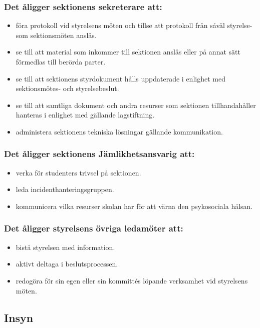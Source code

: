\subsubsection{Det åligger sektionens sekreterare att:}

\begin{itemize}
  \item föra protokoll vid styrelsens möten och tillse att protokoll från såväl styrelse- som sektionsmöten anslås.
  \item se till att material som inkommer till sektionen anslås eller på annat sätt förmedlas till berörda parter.
  \item se till att sektionens styrdokument hålls uppdaterade i enlighet med sektionsmötes- och styrelsebeslut.
  \item se till att samtliga dokument och andra resurser som sektionen tillhandahåller hanteras i enlighet med gällande lagstiftning.
  \item administera sektionens tekniska lösningar gällande kommunikation.
\end{itemize}

\subsubsection{Det åligger sektionens Jämlikhetsansvarig att:}

\begin{itemize}
    \item verka för studenters trivsel på sektionen.
    \item leda incidenthanteringsgruppen.
    \item kommunicera vilka resurser skolan har för att värna den psykosociala
hälsan.
\end{itemize}

\subsubsection{Det åligger styrelsens övriga ledamöter att:}

\begin{itemize}
  \item bistå styrelsen med information.
  \item aktivt deltaga i beslutsprocessen.
  \item redogöra för sin egen eller sin kommittés löpande verksamhet vid styrelsens möten.
\end{itemize}

\subsection{Insyn} 


